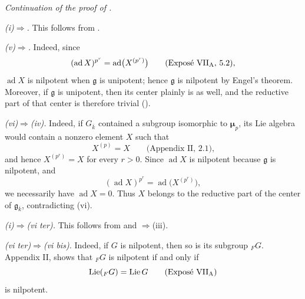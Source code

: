 

\medskip\noindent\textit{Continuation of the proof of .}

\medskip\noindent
\textit{(i)\(\Rightarrow\).}\quad
This follows from .

\medskip\noindent
\textit{(v)\(\Rightarrow\).}\quad
Indeed, since
\[
  (\operatorname{ad}X)^{p^r}
    =\operatorname{ad}\bigl(X^{(p^r)}\bigr)
  \qquad\text{(Exposé VII\textsubscript{A}, 5.2),}
\]
\(\operatorname{ad}X\) is nilpotent when \(\mathfrak g\) is
unipotent; hence \(\mathfrak g\) is nilpotent by Engel's theorem.
Moreover, if \(\mathfrak g\) is unipotent, then its center plainly
is as well, and the reductive part of that center is therefore
trivial ().

\medskip\noindent
\textit{(vi)\(\Rightarrow\)(iv).}\quad
Indeed, if \(G_{\overline{k}}\) contained a subgroup isomorphic to
\(\boldsymbol\mu_p\), its Lie algebra would contain a nonzero
element \(X\) such that
\[
  X^{(p)}=X
  \qquad\text{(Appendix II, 2.1),}
\]
and hence \(X^{(p^r)}=X\) for every \(r>0\).
Since \(\operatorname{ad}X\) is nilpotent because \(\mathfrak g\)
is nilpotent, and
\[
  (\operatorname{ad}X)^{p^r}
    =\operatorname{ad}\bigl(X^{(p^r)}\bigr),
\]
we necessarily have \(\operatorname{ad}X=0\).  Thus \(X\) belongs
to the reductive part of the center of
\(\mathfrak g_{\overline{k}}\), contradicting (vi).

\medskip\noindent
\textit{(i)\(\Rightarrow\)(vi ter).}\quad
This follows from  and \(\Rightarrow\)(iii).

\medskip\noindent
\textit{(vi ter)\(\Rightarrow\)(vi bis).}\quad
Indeed, if \(G\) is nilpotent, then so is its subgroup
\({}_{F}G\).  Appendix II,  shows that \({}_{F}G\) is
nilpotent if and only if
\[
  \operatorname{Lie}({}_{F}G)=\operatorname{Lie}G
  \qquad\text{(Exposé VII\textsubscript{A})}
\]
is nilpotent.

